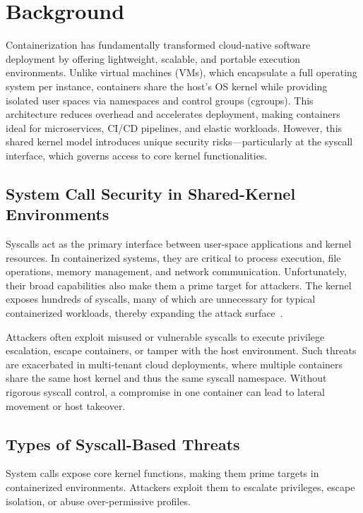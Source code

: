 \section{Background}
\label{sec:background}

Containerization has fundamentally transformed cloud-native software deployment by offering
lightweight, scalable, and portable execution environments. Unlike virtual machines (VMs), which
encapsulate a full operating system per instance, containers share the host's OS kernel while
providing isolated user spaces via namespaces and control groups (cgroups). This architecture
reduces overhead and accelerates deployment, making containers ideal for microservices, CI/CD
pipelines, and elastic workloads. However, this shared kernel model introduces unique security
risks---particularly at the syscall interface, which governs access to core kernel
functionalities.

\subsection{System Call Security in Shared-Kernel Environments}
\label{subsec:syscall_security}

Syscalls act as the primary interface between user-space applications and kernel resources. In
containerized systems, they are critical to process execution, file operations, memory
management, and network communication. Unfortunately, their broad capabilities also make them a
prime target for attackers. The kernel exposes hundreds of syscalls, many of which are
unnecessary for typical containerized workloads, thereby expanding the attack
surface~\cite{ref11_shu_security}.

Attackers often exploit misused or vulnerable syscalls to execute privilege escalation, escape
containers, or tamper with the host environment. Such threats are exacerbated in multi-tenant
cloud deployments, where multiple containers share the same host kernel and thus the same syscall
namespace. Without rigorous syscall control, a compromise in one container can lead to lateral
movement or host takeover.

\subsection{Types of Syscall-Based Threats}
\label{subsec:syscall_threats}

System calls expose core kernel functions, making them prime targets in containerized
environments. Attackers exploit them to escalate privileges, escape isolation, or abuse
over-permissive profiles.


